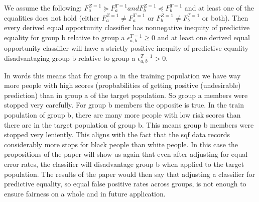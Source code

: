 We assume the following:
$F_a^{Z=1} \succeq F_a^{T=1} and F_b^{Z=1} \preceq F_b^{T=1}$ and at least one of the equalities does not hold (either $F_a^{Z=1} \ne F_a^{T=1}$ or $F_b^{Z=1} \ne F_b^{T=1}$ or both).
Then every derived equal opportunity classifier has nonnegative inequity of predictive equality for group b relative to group a $\epsilon_{a,b}^{T=1} \geq 0$ and at least one derived equal opportunity classifier will have a strictly positive inequity of predictive equality disadvantaging group b relative to group a $\epsilon_{a,b}^{T=1} > 0$.

In words this means that for group a in the training population we have way more people with high scores (propbabilities of getting positive (undesirable) prediction) than in group a of the target population.
So group a members were stopped very carefully. For group b members the opposite is true. In the train population of group b, there are many more people with low risk scores than there are in the target population of group b. This means group b members were stopped very leniently. 
This aligns with the fact that the sqf data records considerably more stops for black people than white people. In this case the propositions of the paper will show us again that even after adjusting for equal error rates, the classifier will disadvantage group b when applied to the target population.
The results of the paper would then say that adjusting a classifier for predictive equality, so equal false positive rates across groups, is not enough to ensure fairness on a whole and in future application. 

